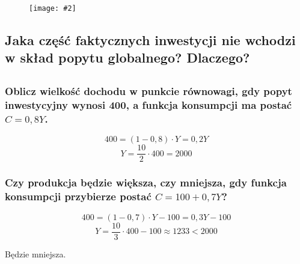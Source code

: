 \documentclass[a4paper,12pt]{article}
\newcommand{\obrazek}[2]{
	\begin{figure}[h]
		\centering
		\texttt{[image: \#2]}
	\end{figure}
}
\begin{document}
\obrazek{0.3}{Inwestycje1.png}

\subsection{Jaka część faktycznych inwestycji nie wchodzi w skład popytu globalnego? Dlaczego?}

\subsection{}

\subsubsection{Oblicz wielkość dochodu w punkcie równowagi, gdy popyt inwestycyjny wynosi 400, a funkcja konsumpcji ma postać $C = 0,8Y$.}

\[400 = \left(1 - 0,8\right)\cdot Y = 0,2Y\]
\[Y = \frac{10}{2} \cdot 400 = 2000\]

\subsubsection{Czy produkcja będzie większa, czy mniejsza, gdy funkcja konsumpcji przybierze postać $C = 100 + 0,7Y$?}

\[400 = \left(1 - 0,7\right)\cdot Y - 100 = 0,3Y - 100\]
\[Y = \frac{10}{3} \cdot 400 - 100 \approx 1233 < 2000\]

Będzie mniejsza.
\end{document}
